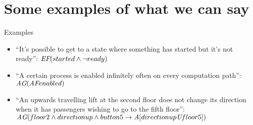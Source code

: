 \section{Some examples of what we can say}
\begin{frame}{Examples}
	\begin{itemize}
		\item 
		{
			``It's possible to get to a state where something has started but it's not ready'': $\textit{E}\textit{F}(started \land \neg ready)$ 
			\pause
		}
		\item
		{
			``A certain process is enabled infinitely often on every computation path'': $\textit{A}\textit{G}(\textit{A}\textit{F} enabled)$	
			\pause
		}
		\item
		{
			``An upwards travelling lift at the second floor does not change its direction when it has passengers wishing to go to the fifth floor'': $\textit{A}\textit{G}(floor2 \land directionup \land button5 \to \textit{A}[directionup \textit{U} floor5])$
		}
	\end{itemize}
\end{frame}